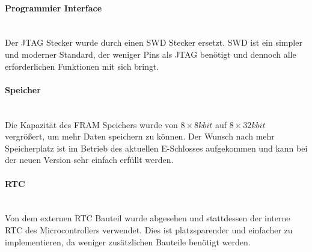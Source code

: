 \paragraph{Programmier Interface}\mbox{}\\
Der \ac{JTAG} Stecker wurde durch einen \ac{SWD} Stecker ersetzt. \ac{SWD} ist ein simpler und moderner Standard, der
weniger Pins als \ac{JTAG} benötigt und dennoch alle erforderlichen Funktionen mit sich bringt. 

\paragraph{Speicher}\mbox{}\\
Die Kapazität des \ac{FRAM} Speichers wurde von \(8 \times 8kbit\) auf \(8 \times 32kbit\) vergrößert, um mehr Daten speichern 
zu können. Der Wunsch nach mehr Speicherplatz ist im Betrieb des aktuellen E-Schlosses aufgekommen und kann bei der neuen Version
sehr einfach erfüllt werden.

\paragraph{\ac{RTC}}\mbox{}\\
Von dem externen \ac{RTC} Bauteil wurde abgesehen und stattdessen der interne \ac{RTC} des Microcontrollers verwendet. Dies ist
platzsparender und einfacher zu implementieren, da weniger zusätzlichen Bauteile benötigt werden.